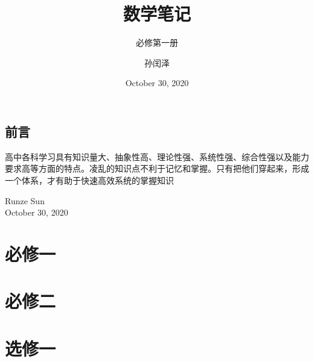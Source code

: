 \documentclass[lang=cn,11pt,chinese]{elegantbook}
\title{数学笔记}
\subtitle{必修第一册}
\author{孙闰泽}
\institute{山东省桓台第二中学}
\date{October 30, 2020}
\begin{document}
\maketitle
\frontmatter

\chapter*{前言}
高中各科学习具有知识量大、抽象性高、理论性强、系统性强、综合性强以及能力要求高等方面的特点。凌乱的知识点不利于记忆和掌握。只有把他们穿起来，形成一个体系，才有助于快速高效系统的掌握知识
\vskip 1.5cm

\begin{flushright}
Runze Sun\\
October 30, 2020
\end{flushright}

\tableofcontents

\mainmatter

\part{必修一}












\part{必修二}


\part{选修一}

\nocite{*} 

\appendix




\end{document}
